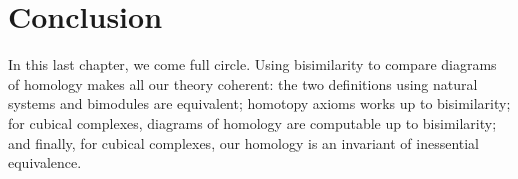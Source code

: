 \section*{Conclusion}

In this last chapter, we come full circle. Using bisimilarity to compare diagrams of homology makes all our theory coherent: the two definitions using natural systems and bimodules are equivalent; homotopy axioms works up to bisimilarity; for cubical complexes, diagrams of homology are computable up to bisimilarity; and finally, for cubical complexes, our homology is an invariant of inessential equivalence.





